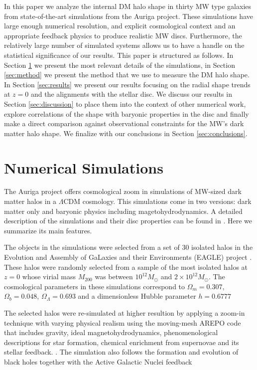 \documentclass[usenatbib]{mnras}
\begin{document}
In this paper we analyze the internal DM halo shape in thirty MW type
galaxies from state-of-the-art simulations from the Auriga project.
These simulations have large enough numerical resolution, and explicit
cosmological context and an appropriate feedback physics to produce
realistic MW discs.
Furthermore, the relatively large number of simulated systems allows us
to have a handle on the statistical significance of our results.
This paper is structured as follows. 
In Section \ref{sec:numerical} we present the most relevant details of
the simulations, in Section \ref{sec:method} we present the method
that we use to measure the DM halo shape. 
In Section \ref{sec:results} we present our results focusing on the
radial shape trends at $z=0$ and the alignments with the stellar disc.
We discuss our results in Section \ref{sec:discussion} to place them
into the context of other numerical work, explore correlations of the
shape with baryonic properties in the disc and finally make a direct
comparison against observational constraints for the MW's dark matter halo shape.
We finalize with our conclusions in Section \ref{sec:conclusions}.


\section{Numerical Simulations}
\label{sec:numerical}

The Auriga project offers cosmological zoom in simulations of MW-sized 
dark matter halos in a $\Lambda$CDM cosmology. 
This simulations come in two versions: dark matter only and
baryonic physics including magetohydrodynamics.
A detailed description of the simulations and their disc properties
can be found in \citep{auriga}.
Here we summarize its main features.

The objects in the simulations were selected from a set of 30
isolated halos in the Evolution and Assembly of GaLaxies and their
Environments (EAGLE)  project \citep{Eagle}.   
These halos were randomly selected from a sample of the most isolated
halos at $z=0$ whose virial mass $M_{200}$ was between $10^{12}M_\odot$ and
$2\times 10^{12}M_\odot$. 
The cosmological parameters in these simulations correspond to
$\Omega_m=0.307$, $\Omega_b=0.048$, $\Omega_\Lambda=0.693$ and a
dimensionless Hubble parameter $h=0.6777$ \citep{2014A&A...571A..16P}

The selected halos were re-simulated at higher resultion by applying a
zoom-in technique with varying physical realism using the moving-mesh AREPO code
that includes gravity, ideal magnetohydrodynamics,  phenomenological
descriptions for star formation, chemical enrichment from supernovae
and its stellar feedback.   
\citep{arepo,2013MNRAS.432..176P}.
The simulation also follows the formation and evolution of black holes
together with the Active Galactic Nuclei feedback
\end{document}
